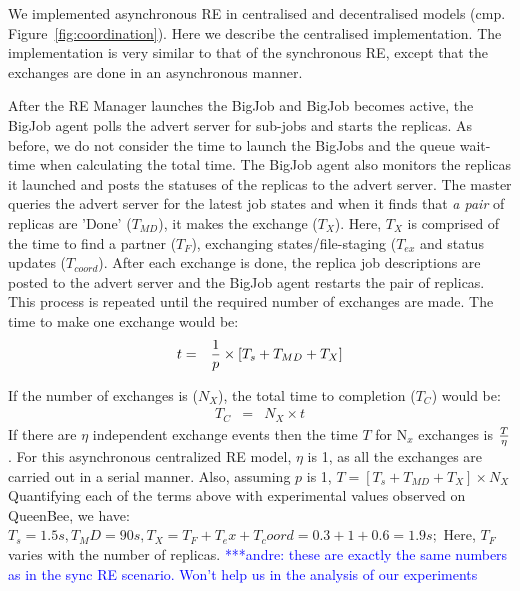 \documentclass{rspublic}
\newcommand{\alnote}[1]{ {\textcolor{blue} { ***andre: #1 }}}
\newcommand{\athotanote}[1]{ {\textcolor{green} { ***athota: #1 }}}
\newcommand{\alnote}[1]{}
\newcommand{\athotanote}[1]{}
\begin{document}

We implemented asynchronous RE in centralised and decentralised models 
(cmp. Figure~\ref{fig:coordination}). Here we describe the centralised 
implementation. The implementation is very similar to that of the 
synchronous RE, except that the exchanges are done in an asynchronous manner. 

After the RE Manager launches the BigJob and BigJob becomes active, the BigJob agent polls the advert server for sub-jobs and starts the replicas. As before, we do not consider the time to launch the BigJobs and the queue wait-time when calculating the total time.  The BigJob agent also monitors the 
replicas it launched and posts the statuses of the replicas to the advert 
server. The master queries the advert server for the latest job 
states and when it finds that \emph{a pair} of replicas are 'Done' ($T_{MD}$), it 
makes the exchange ($T_{X}$). Here, $T_{X}$ is comprised of the time to find a partner ($T_{F}$), exchanging states/file-staging ($T_{ex}$ and status updates ($T_{coord}$). 
After each exchange is done, the replica job descriptions 
are posted to the advert server and the BigJob agent restarts the pair of
replicas. This process is repeated until the required number of 
exchanges are made. The time to make one exchange would be:
\begin{eqnarray}
t &=&  {1 \over p} \times {[T_s+T_{MD} + T_{X}]} 
\label{eq:cent}
\end{eqnarray}

If the number of exchanges is ($N_{X}$), the total time to completion ($T_{C}$) would be:
\begin{eqnarray}
T_{C} &=& N_{X} \times t 
\label{eq:centr}
\end{eqnarray}
If there are $\eta$ independent exchange events then the time $T$ for
N$_x$ exchanges is $T \over \eta$. For this asynchronous centralized
RE model, $\eta$ is 1, as all the exchanges are carried out in a
serial manner. Also, assuming $p$ is 1, $T = [T_s+T_{MD} + T_{X} ]
\times N_{X}$ Quantifying each of the terms above with experimental
values observed on QueenBee, we have: $T_s = 1.5 s, T_MD=90 s,
T_X=T_F+T_ex+T_coord=0.3+1+0.6=1.9 s; $ Here, $T_F$ varies with the
number of replicas. \alnote{these are exactly the same numbers as in
  the sync RE scenario. Won't help us in the analysis of our
  experiments}
\end{document}
